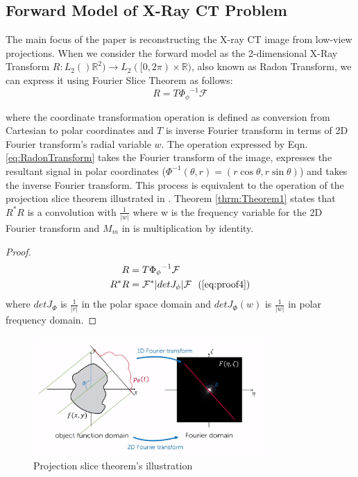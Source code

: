 \documentclass[journal, onecolumn, 11pt]{IEEEtran}
\begin{document}
\subsection{Forward Model of X-Ray CT Problem}
The main focus of the paper is reconstructing the X-ray CT image from low-view projections. When we consider the forward model as the 2-dimensional X-Ray Transform $R: L_2()\mathbb{R}^2) \rightarrow L_2([0,2\pi) \times \mathbb{R})$, also known as Radon Transform, we can express it using Fourier Slice Theorem as follows: 
\begin{equation}
    R = T {\Phi_\phi}^{-1} \mathcal{F}
    \label{eq:RadonTransform}
\end{equation}


where the coordinate transformation operation is defined as conversion from Cartesian to polar coordinates and $T$ is inverse Fourier transform in terms of 2D Fourier transform's radial variable $w$. The operation expressed by Eqn. \ref{eq:RadonTransform} takes the Fourier transform of the image, expresses the resultant signal in polar coordinates ($\Phi^{-1}(\theta, r) = (r\cos\theta,r\sin\theta)$) and takes the inverse Fourier transform. This process is equivalent to the operation of the projection slice theorem illustrated in . Theorem \ref{thrm:Theorem1} states that $R^\ast R$ is a convolution with $\frac{1}{|w|}$ where w is the frequency variable for the 2D Fourier transform and $M_m$ in  is multiplication by identity. 

\begin{proof}
    \begin{align}
        R &= T {\Phi_\phi}^{-1} \mathcal{F} \\
        R^\ast R &=  \mathcal{F}^\ast |det J_\phi| \mathcal{F} \ \ (\ref{eq:proof4}) \\
    \end{align}
    where $det J_\Phi$ is $\frac{1}{|r|}$ in the polar space domain and $det J_\Phi(w)$ is $\frac{1}{|w|}$ in polar frequency domain.
\end{proof}

\begin{figure}[h]
    \centering
    \includegraphics[width=0.8\textwidth]{images/slicethm.png}
    \caption{Projection slice theorem's illustration \cite{kooi_2021}}\label{fig:radonimg}
    \end{figure}
\end{document}
